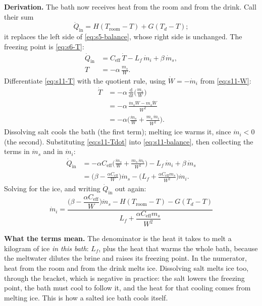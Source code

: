 \documentclass[11pt,a4paper]{article}
\newcommand{\dd}{\mathrm{d}}
\newcommand{\Troom}{T_{\mathrm{room}}}
\newcommand{\Ceff}{C_{\mathrm{eff}}}
\newcommand{\para}[1]{\par\smallskip\noindent\textbf{#1}\enspace}
\begin{document}
\para{Derivation.} The bath now receives heat from the room and from the drink. Call their sum
\begin{equation}
\dot Q_{\mathrm{in}} = H(\Troom - T) + G(T_d - T); \label{eq:s11-Qin}
\end{equation}
it replaces the left side of \eqref{eq:s5-balance}, whose right side is unchanged. The freezing point is
\eqref{eq:s6-T}:
\begin{align}
\dot Q_{\mathrm{in}} &= \Ceff\,\dot T - L_f\,\dot m_i + \beta\,\dot m_s, \label{eq:s11-balance}\\
T &= -\alpha\,\frac{m_s}{W}. \label{eq:s11-T}
\end{align}
Differentiate \eqref{eq:s11-T} with the quotient rule, using $\dot W = -\dot m_i$ from \eqref{eq:s11-W}:
\begin{align}
\dot T &= -\alpha\,\frac{\dd}{\dd t}\Big(\frac{m_s}{W}\Big) \label{eq:s11-Tdot1}\\
&= -\alpha\,\frac{\dot m_sW - m_s\dot W}{W^2} \label{eq:s11-Tdot2}\\
&= -\alpha\Big(\frac{\dot m_s}{W} + \frac{m_s\,\dot m_i}{W^2}\Big). \label{eq:s11-Tdot}
\end{align}
Dissolving salt cools the bath (the first term); melting ice warms it, since $\dot m_i < 0$ (the second).
Substituting \eqref{eq:s11-Tdot} into \eqref{eq:s11-balance}, then collecting the terms in $\dot m_s$ and in
$\dot m_i$:
\begin{align}
\dot Q_{\mathrm{in}} &= -\alpha\Ceff\Big(\frac{\dot m_s}{W} + \frac{m_s\,\dot m_i}{W^2}\Big) - L_f\,\dot m_i + \beta\,\dot m_s \label{eq:s11-sub}\\
&= \Big(\beta - \frac{\alpha\Ceff}{W}\Big)\dot m_s - \Big(L_f + \frac{\alpha\Ceff m_s}{W^2}\Big)\dot m_i . \label{eq:s11-collect}
\end{align}
Solving for the ice, and writing $\dot Q_{\mathrm{in}}$ out again:
\begin{equation}
\boxed{\,\dot m_i = \frac{\Big(\beta - \dfrac{\alpha\Ceff}{W}\Big)\dot m_s - H(\Troom - T) - G(T_d - T)}{L_f + \dfrac{\alpha\Ceff m_s}{W^2}}\,} \label{eq:s11-mi}
\end{equation}

\para{What the terms mean.} The denominator is the heat it takes to melt a kilogram of ice \emph{in this
bath}: $L_f$, plus the heat that warms the whole bath, because the meltwater dilutes the brine and raises its
freezing point. In the numerator, heat from the room and from the drink melts ice. Dissolving salt melts ice
too, through the bracket, which is negative in practice: the salt lowers the freezing point, the bath must
cool to follow it, and the heat for that cooling comes from melting ice. This is how a salted ice bath cools
itself.
\end{document}
